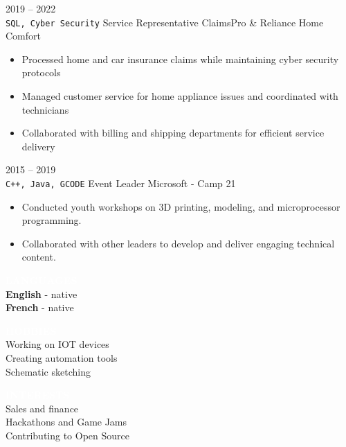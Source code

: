 \documentclass[9pt]{src/developercv} %
\begin{document}
\begin{entrylist}
{\begin{itemize}
			\end{itemize}
			}
		\entry
			{2019 -- 2022\\\small{\texttt{SQL, Cyber Security}}}
			{Service Representative}
			{ClaimsPro \& Reliance Home Comfort}
			{
				\vspace{-1.0\baselineskip}
				\begin{itemize}
					\item Processed home and car insurance claims while maintaining cyber security protocols
					\item Managed customer service for home appliance issues and coordinated with technicians
					\item Collaborated with billing and shipping departments for efficient service delivery
				\end{itemize}
			}
	\entry
		{2015 -- 2019\\\small{\texttt{C++, Java, GCODE}}}
		{Event Leader}
		{Microsoft - Camp 21}
		{
			\vspace{-1.0\baselineskip}%
			\begin{itemize}
				\item Conducted youth workshops on 3D printing, modeling, and microprocessor programming.
				\item Collaborated with other leaders to develop and deliver engaging technical content.
			\end{itemize}
		}
\end{entrylist}

\begin{minipage}[t]{0.25\textwidth}
	\vspace{\baselineskip} %
	\colorbox{sky900}{\textcolor{white}{\MakeUppercase{\textbf{Languages}}}}\\%

	\textbf{English} - native\\
	\textbf{French} - native
\end{minipage}
\hfill
\begin{minipage}[t]{0.25\textwidth}
	\vspace{\baselineskip} %
	\colorbox{sky800}{\textcolor{white}{\MakeUppercase{\textbf{Hobbies}}}}\\%

	Working on IOT devices\\
	Creating automation tools\\
	Schematic sketching
\end{minipage}
\hfill
\begin{minipage}[t]{0.25\textwidth}
	\vspace{\baselineskip} %
	\colorbox{sky700}{\textcolor{white}{\MakeUppercase{\textbf{Interests}}}}\\%

	Sales and finance\\
	Hackathons and Game Jams\\
	Contributing to Open Source
\end{minipage}
\end{document}
